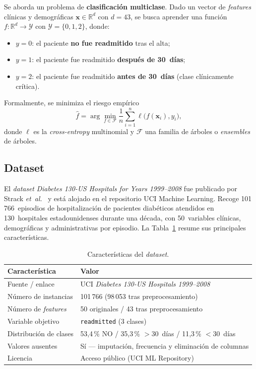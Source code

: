 \documentclass[11pt,a4paper]{article}
\begin{document}
Se aborda un problema de \textbf{clasificación multiclase}. Dado un vector de \textit{features} clínicas y demográficas $\bm{x} \in \mathbb{R}^{d}$ con $d=43$, se busca aprender una función $f\colon \mathbb{R}^d \to \mathcal{Y}$ con $\mathcal{Y} = \{0, 1, 2\}$, donde:
\begin{itemize}
    \item $y=0$: el paciente \textbf{no fue readmitido} tras el alta;
    \item $y=1$: el paciente fue readmitido \textbf{después de 30~días};
    \item $y=2$: el paciente fue readmitido \textbf{antes de 30~días} (clase clínicamente crítica).
\end{itemize}
Formalmente, se minimiza el riesgo empírico
\begin{equation}
   \hat{f} = \arg\min_{f \in \mathcal{F}} \frac{1}{n}\sum_{i=1}^{n} \ell\bigl(f(\bm{x}_i), y_i\bigr),
   \label{eq:obj}
\end{equation}
donde $\ell$ es la \textit{cross-entropy} multinomial y $\mathcal{F}$ una familia de árboles o \textit{ensembles} de árboles.

\subsection{Dataset}

El \textit{dataset} \textit{Diabetes 130-US Hospitals for Years 1999--2008} fue publicado por Strack \emph{et~al.}~\cite{ref_strack} y está alojado en el repositorio UCI Machine Learning. Recoge 101\,766~episodios de hospitalización de pacientes diabéticos atendidos en 130~hospitales estadounidenses durante una década, con 50~variables clínicas, demográficas y administrativas por episodio. La Tabla~\ref{tab:dataset} resume sus principales características.

\begin{table}[H]
\centering
\caption{Características del \textit{dataset}.}
\label{tab:dataset}
\small
\begin{tabular}{@{}ll@{}}
\toprule
\textbf{Característica} & \textbf{Valor} \\
\midrule
Fuente / enlace           & UCI \textit{Diabetes 130-US Hospitals 1999--2008}~\cite{ref_strack} \\
Número de instancias      & 101\,766 (98\,053 tras preprocesamiento) \\
Número de \textit{features} & 50 originales / 43 tras preprocesamiento \\
Variable objetivo         & \texttt{readmitted} (3 clases) \\
Distribución de clases    & 53{,}4\,\% NO / 35{,}3\,\% $>$30~días / 11{,}3\,\% $<$30~días \\
Valores ausentes          & Sí --- imputación, frecuencia y eliminación de columnas \\
Licencia                  & Acceso público (UCI ML Repository) \\
\bottomrule
\end{tabular}
\end{table}
\end{document}
